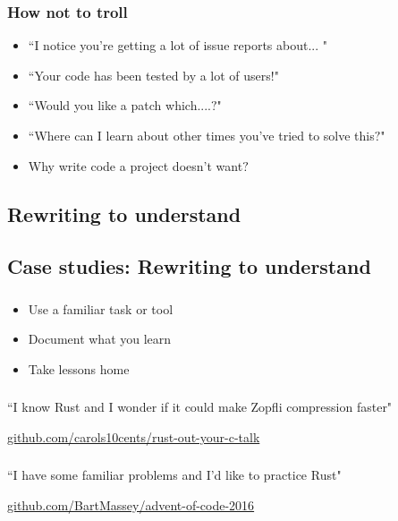 \documentclass{beamer}
\begin{document}
\begin{frame}[fragile]
\frametitle{How not to troll}
\begin{itemize}[<+(1)->]
\item ``I notice you're getting a lot of issue reports about... "
\item ``Your code has been tested by a lot of users!"
\item ``Would you like a patch which....$?$"
\item ``Where can I learn about other times you've tried to solve this$?$"
\item Why write code a project doesn't want$?$
\end{itemize}
\end{frame}


\subsection{Rewriting to understand}

\begin{frame}[fragile]
\tableofcontents[currentsubsection]
\end{frame}

\subsection{Case studies: Rewriting to understand}

\begin{frame}[fragile]
\frametitle{\insertsubsectionhead}
\begin{itemize}[<+(1)->]
\item Use a familiar task or tool
\item Document what you learn
\item Take lessons home
\end{itemize}
\end{frame}


\begin{frame}[fragile]
\frametitle{\insertsubsectionhead}

``I know Rust and I wonder if it could make Zopfli compression faster"

\url{github.com/carols10cents/rust-out-your-c-talk}

\end{frame}

\begin{frame}[fragile]
\frametitle{\insertsubsectionhead}

``I have some familiar problems and I'd like to practice Rust"

\url{github.com/BartMassey/advent-of-code-2016}

\end{frame}
\end{document}
